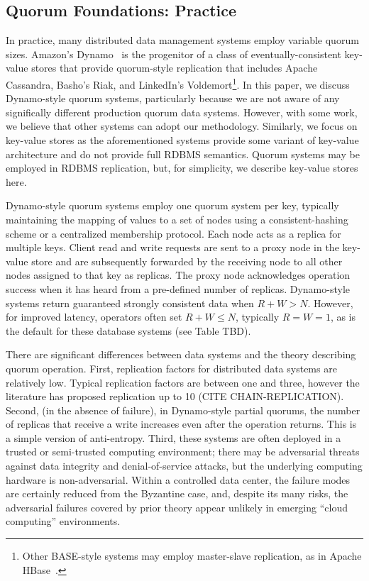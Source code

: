 \documentclass{vldb}
\begin{document}
\subsection{Quorum Foundations: Practice}
\label{sec:practice}

In practice, many distributed data management systems employ variable
quorum sizes. Amazon's Dynamo~\cite{dynamo} is the progenitor of a
class of eventually-consistent key-value stores that provide
quorum-style replication that includes Apache Cassandra, Basho's Riak,
and LinkedIn's Voldemort\footnote{Other BASE-style systems may employ
  master-slave replication, as in Apache HBase~\cite{hbase}.}.  In
this paper, we discuss Dynamo-style quorum systems, particularly
because we are not aware of any significally different production
quorum data systems.  However, with some work, we believe that other
systems can adopt our methodology.  Similarly, we focus on key-value
stores as the aforementioned systems provide some variant of key-value
architecture and do not provide full RDBMS semantics.  Quorum systems
may be employed in RDBMS replication, but, for simplicity, we describe
key-value stores here.

Dynamo-style quorum systems employ one quorum system per key,
typically maintaining the mapping of values to a set of nodes using a
consistent-hashing scheme or a centralized membership protocol. Each
node acts as a replica for multiple keys.  Client read and write
requests are sent to a proxy node in the key-value store and are
subsequently forwarded by the receiving node to all other nodes
assigned to that key as replicas.  The proxy node acknowledges
operation success when it has heard from a pre-defined number of
replicas.  Dynamo-style systems return guaranteed strongly consistent
data when $R+W > N$.  However, for improved latency, operators often
set $R+W \leq N$, typically $R=W=1$, as is the default for these
database systems (see Table TBD).

There are significant differences between data systems and the theory
describing quorum operation.  First, replication factors for
distributed data systems are relatively low.  Typical replication
factors are between one and three, however the literature has proposed
replication up to 10 (CITE CHAIN-REPLICATION).  Second, (in the
absence of failure), in Dynamo-style partial quorums, the number of
replicas that receive a write increases even after the operation
returns.  This is a simple version of anti-entropy.  Third, these
systems are often deployed in a trusted or semi-trusted computing
environment; there may be adversarial threats against data integrity
and denial-of-service attacks, but the underlying computing hardware
is non-adversarial. Within a controlled data center, the failure modes
are certainly reduced from the Byzantine case, and, despite its many
risks, the adversarial failures covered by prior theory appear
unlikely in emerging ``cloud computing'' environments.
\end{document}
